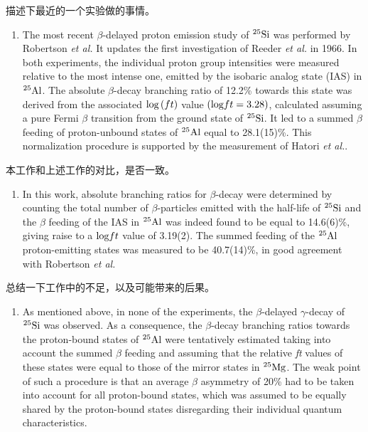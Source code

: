 \documentclass[UTF8]{ctexart}
\begin{document}
描述下最近的一个实验做的事情。

\begin{enumerate}
    \item The most recent $\beta$-delayed proton emission study of $^{25}\textnormal{Si}$ was performed by Robertson \textit{et al.} It updates the first investigation of Reeder \textit{et al.} in 1966. In both experiments, the individual proton group intensities were measured relative to the most intense one, emitted by the isobaric analog state (IAS) in $^{25}\textnormal{Al}$. The absolute $\beta$-decay branching ratio of 12.2\% towards this state was derived from the associated $\textnormal{log}\left( ft \right)$ value $\left( \textnormal{log}ft=3.28 \right)$, calculated assuming a pure Fermi $\beta$ transition from the ground state of $^{25}\textnormal{Si}$. It led to a summed $\beta$ feeding of proton-unbound states of $^{25}\textnormal{Al}$ equal to 28.1(15)\%. This normalization procedure is supported by the measurement of Hatori \textit{et al.}. 
\end{enumerate}

本工作和上述工作的对比，是否一致。

\begin{enumerate}
    \item In this work, absolute branching ratios for $\beta$-decay were determined by counting the total number of $\beta$-particles emitted with the half-life of $^{25}\textnormal{Si}$ and the $\beta$ feeding of the IAS in $^{25}\textnormal{Al}$ was indeed found to be equal to 14.6(6)\%, giving raise to a $\textnormal{log}ft$ value of 3.19(2). The summed feeding of the $^{25}\textnormal{Al}$ proton-emitting states was measured to be 40.7(14)\%, in good agreement with Robertson \textit{et al.}
\end{enumerate}

总结一下工作中的不足，以及可能带来的后果。
\begin{enumerate}
    \item As mentioned above, in none of the experiments, the $\beta$-delayed $\gamma$-decay of $^{25}\textnormal{Si}$ was observed. As a consequence, the $\beta$-decay branching ratios towards the proton-bound states of $^{25}\textnormal{Al}$ were tentatively estimated taking into account the summed $\beta$ feeding and assuming that the relative \textit{ft} values of these states were equal to those of the mirror states in $^{25}\textnormal{Mg}$. The weak point of such a procedure is that an average $\beta$ asymmetry of 20\% had to be taken into account for all proton-bound states, which was assumed to be equally shared by the proton-bound states disregarding their individual quantum characteristics.
\end{enumerate}
\end{document}
